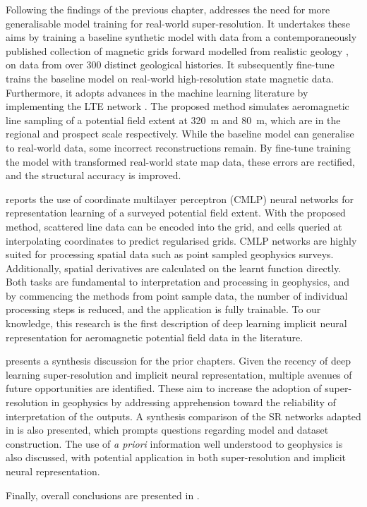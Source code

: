 Following the findings of the previous chapter,  addresses the need for more generalisable model training for real-world super-resolution.
It undertakes these aims by training a baseline synthetic model with data from a contemporaneously published collection of magnetic grids forward modelled from realistic geology \parencite{jessellNoddyverseMassiveData2022}, on data from over \num{300} distinct geological histories.
It subsequently fine-tune trains the baseline model on real-world high-resolution state magnetic data.
Furthermore, it adopts advances in the machine learning literature by implementing the LTE network \parencite{leeLocalTextureEstimator2022}.
The proposed method simulates aeromagnetic line sampling of a potential field extent at \qty{320}{\m} and \qty{80}{\m}, which are in the regional and prospect scale respectively.
While the baseline model can generalise to real-world data, some incorrect reconstructions remain.
By fine-tune training the model with transformed real-world state map data, these errors are rectified, and the structural accuracy is improved.

 reports the use of coordinate multilayer perceptron (CMLP) neural networks for representation learning of a surveyed potential field extent.
With the proposed method, scattered line data can be encoded into the grid, and cells queried at interpolating coordinates to predict regularised grids.
CMLP networks are highly suited for processing spatial data such as point sampled geophysics surveys.
Additionally, spatial derivatives are calculated on the learnt function directly.
Both tasks are fundamental to interpretation and processing in geophysics, and by commencing the methods from point sample data, the number of individual processing steps is reduced, and the application is fully trainable.
To our knowledge, this research is the first description of deep learning implicit neural representation for aeromagnetic potential field data in the literature.

 presents a synthesis discussion for the prior chapters. Given the recency of deep learning super-resolution and implicit neural representation, multiple avenues of future opportunities are identified.
These aim to increase the adoption of super-resolution in geophysics by addressing apprehension toward the reliability of interpretation of the outputs.
A synthesis comparison of the SR networks adapted in  is also presented, which prompts questions regarding model and dataset construction.
The use of \emph{a priori} information well understood to geophysics is also discussed, with potential application in both super-resolution and implicit neural representation.

Finally, overall conclusions are presented in .

\printbibliography{}

% 